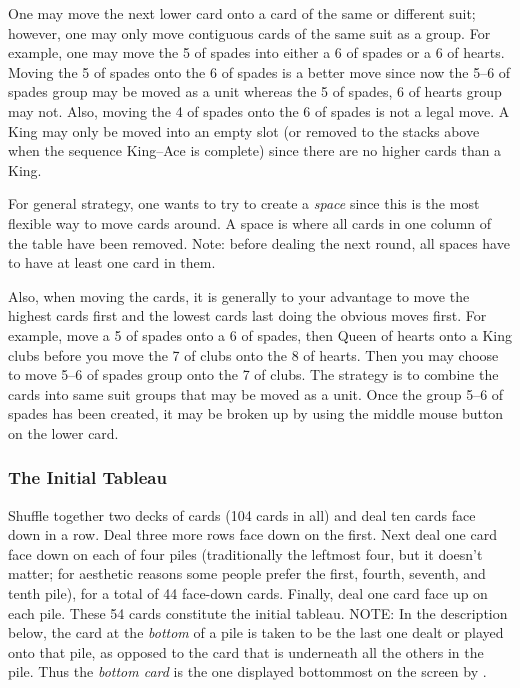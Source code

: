 One may move the next lower card onto a card of the same or different suit;
however, one may only move contiguous cards of the same suit as a group.  For
example, one may move the 5 of spades into either a 6 of spades or a 6 of
hearts. Moving the 5 of spades onto the 6 of spades is a better move since now
the 5--6 of spades group may be moved as a unit whereas the 5 of spades, 6 of
hearts group may not.  Also, moving the 4 of spades onto the 6 of spades is
not a legal move.  A King may only be moved into an empty slot (or removed 
to the stacks above when the sequence King--Ace is complete) 
since there are no higher cards than a King.

For general strategy, one wants to try to create a {\em space} since this is
the most flexible way to move cards around.  A space is where all cards in
one column of the table have been removed.  Note:  before dealing the next
round, all spaces have to have at least one card in them.

Also, when moving the cards, it is generally to your advantage to move
the highest cards first and the lowest cards last doing the obvious moves
first.  For example, move a 5 of spades onto a 6 of spades, then Queen of
hearts onto a King clubs before you move the 7 of clubs onto the 8 of hearts.
Then you may choose to move 5--6 of spades group onto the 7 of clubs.  The
strategy is to combine the cards into same suit groups that may be moved as
a unit.  Once the group 5--6 of spades has been created, it may be broken
up by using the middle mouse button on the lower card.


\subsubsection*{The Initial Tableau}
Shuffle together two decks of cards (104 cards in all)
and deal ten cards face down in a row.  Deal three more rows face down on the
first.  Next deal one card face down on each of four piles (traditionally the
leftmost four, but it doesn't matter; for aesthetic reasons some people
prefer the first, fourth, seventh, and tenth pile), for a total of 44
face-down cards.  Finally, deal one card face up on each pile.  These 54
cards constitute the initial tableau.  NOTE: In the description below, the
card at the {\em bottom} of a pile is taken to be the last one dealt or played
onto that pile, as opposed to the card that is underneath all the others in
the pile.  Thus the {\em bottom card} is the one displayed bottommost on the
screen by \xpat.

